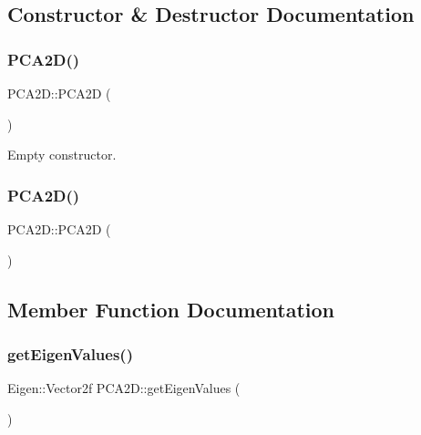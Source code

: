 \subsection{Constructor \& Destructor Documentation}
\mbox{\label{classPCA2D_a30d944a9dc80740707c532cabe91ebdf}} 
\subsubsection{\texorpdfstring{P\+C\+A2\+D()}{PCA2D()}\hspace{0.1cm}{\footnotesize\ttfamily [1/2]}}
{\footnotesize\ttfamily P\+C\+A2\+D\+::\+P\+C\+A2D (\begin{DoxyParamCaption}{ }\end{DoxyParamCaption})\hspace{0.3cm}{\ttfamily [inline]}}



Empty constructor. 

\mbox{\label{classPCA2D_a30d944a9dc80740707c532cabe91ebdf}} 
\subsubsection{\texorpdfstring{P\+C\+A2\+D()}{PCA2D()}\hspace{0.1cm}{\footnotesize\ttfamily [2/2]}}
{\footnotesize\ttfamily P\+C\+A2\+D\+::\+P\+C\+A2D (\begin{DoxyParamCaption}{ }\end{DoxyParamCaption})\hspace{0.3cm}{\ttfamily [inline]}}



\subsection{Member Function Documentation}
\mbox{\label{classPCA2D_ace26902adea167c5aef9a3219ceafbd3}} 
\subsubsection{\texorpdfstring{get\+Eigen\+Values()}{getEigenValues()}\hspace{0.1cm}{\footnotesize\ttfamily [1/2]}}
{\footnotesize\ttfamily Eigen\+::\+Vector2f P\+C\+A2\+D\+::get\+Eigen\+Values (\begin{DoxyParamCaption}{ }\end{DoxyParamCaption})\hspace{0.3cm}{\ttfamily [inline]}}



